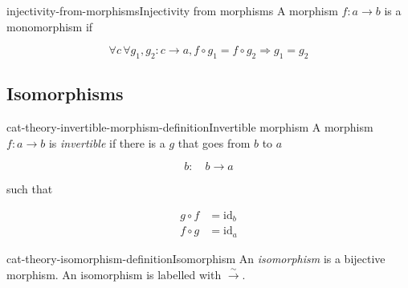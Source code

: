 \documentclass[preview]{standalone}
\begin{document}
\begin{snippetdefinition}{injectivity-from-morphisms}{Injectivity from morphisms}
    A morphism \(f: a \rightarrow b\) is a monomorphism if
    
    \[
        \forall c\, \forall g_1, g_2: c \rightarrow a, 
        f \circ g_1 = f \circ g_2 \Rightarrow g_1 = g_2
    \]

    \begin{center}
    \end{center}
\end{snippetdefinition}

\subsection{Isomorphisms}

\begin{snippetdefinition}{cat-theory-invertible-morphism-definition}{Invertible morphism}
    A morphism \(f: a \rightarrow b\) is \textit{invertible} if there
    is a \function \(g\) that goes from \(b\) to \(a\)
    
    \[
        b:\quad b \rightarrow a
    \]
    
    such that
    
    \begin{align*}
        g \circ f &= \text{id}_b
        \\
        f \circ g &= \text{id}_a
    \end{align*}
    
    \begin{center}
    \end{center}
\end{snippetdefinition}

\begin{snippetdefinition}{cat-theory-isomorphism-definition}{Isomorphism}
    An \textit{isomorphism} is a bijective morphism.
    An isomorphism is labelled with \(\xrightarrow{\sim}\).
\end{snippetdefinition}

\end{document}
